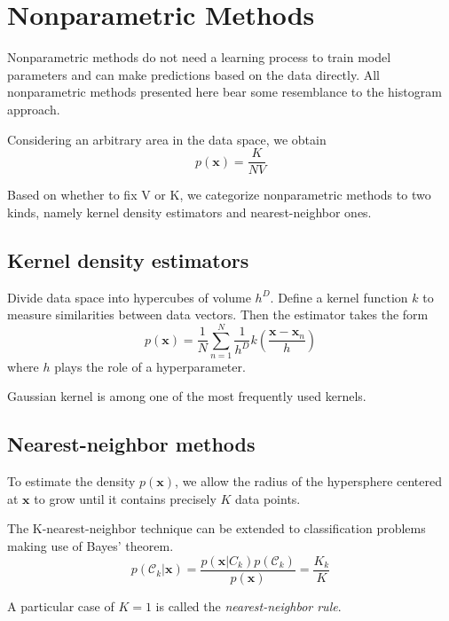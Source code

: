 \documentclass[a4paper]{book}
\renewcommand{\bf}{\mathbf}
\renewcommand{\cal}{\mathcal}
\begin{document}
\section{Nonparametric Methods}
Nonparametric methods do not need a learning process to train model parameters and can make predictions based on the data directly. All nonparametric methods presented here bear some resemblance to the histogram approach.

Considering an arbitrary area in the data space, we obtain
\begin{equation}
	p(\bf{x}) =\frac{K}{NV}
\end{equation}

Based on whether to fix V or K, we categorize nonparametric methods to two kinds, namely kernel density estimators and nearest-neighbor ones.
\subsection{Kernel density estimators}
Divide data space into hypercubes of volume $h^{D}$. Define a kernel function $k$ to measure similarities between data vectors. Then the estimator takes the form
\begin{equation}
	p(\bf{x}) = \frac{1}{N} \sum_{n=1}^{N} \frac{1}{h^{D}}k(\frac{\bf{x-x}_n}{h})
\end{equation}
where $h$ plays the role of a hyperparameter.

Gaussian kernel is among one of the most frequently used kernels.
\subsection{Nearest-neighbor methods}
To estimate the density $p(\bf{x})$, we allow the radius of the hypersphere centered at $\bf{x}$ to grow until it contains precisely $K$ data points.

The K-nearest-neighbor technique can be extended to classification problems making use of Bayes' theorem.
\begin{equation}
	p(\cal{C}_k|\bf{x})=\frac{p(\bf{x}|C_k)p(\cal{C}_k)}{p(\bf{x})}=\frac{K_k}{K}
\end{equation}

A particular case of $K=1$ is called the \emph{nearest-neighbor rule}.
\end{document}
